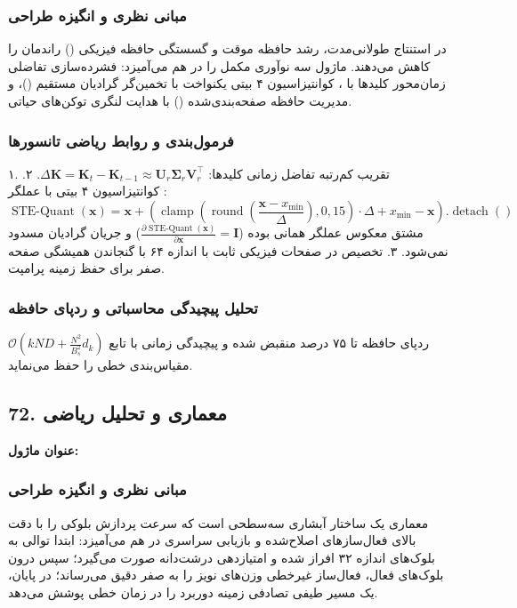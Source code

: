 \subsubsection*{مبانی نظری و انگیزه طراحی}
در استنتاج طولانی‌مدت، رشد حافظه موقت و گسستگی حافظه فیزیکی () راندمان را کاهش می‌دهند. ماژول  سه نوآوری مکمل را در هم می‌آمیزد: فشرده‌سازی تفاضلی زمان‌محور کلیدها با ، کوانتیزاسیون ۴ بیتی یکنواخت با تخمین‌گر گرادیان مستقیم ()، و مدیریت حافظه صفحه‌بندی‌شده () با هدایت لنگری توکن‌های حیاتی.

\subsubsection*{فرمول‌بندی و روابط ریاضی تانسورها}
۱. تقریب کم‌رتبه تفاضل زمانی کلیدها: $\Delta \mathbf{K} = \mathbf{K}_t - \mathbf{K}_{t-1} \approx \mathbf{U}_r \mathbf{\Sigma}_r \mathbf{V}_r^\top$.
۲. کوانتیزاسیون ۴ بیتی با عملگر :
\begin{equation}
\operatorname{STE-Quant}(\mathbf{x}) = \mathbf{x} + \left(\operatorname{clamp}\left(\operatorname{round}\left(\frac{\mathbf{x} - x_{\min}}{\Delta}\right), 0, 15\right) \cdot \Delta + x_{\min} - \mathbf{x}\right).\operatorname{detach}()
\end{equation}
مشتق معکوس عملگر همانی بوده ($\frac{\partial \operatorname{STE-Quant}(\mathbf{x})}{\partial \mathbf{x}} = \mathbf{I}$) و جریان گرادیان مسدود نمی‌شود.
۳. تخصیص در صفحات فیزیکی ثابت با اندازه ۶۴ با گنجاندن همیشگی صفحه صفر برای حفظ زمینه پرامپت.

\subsubsection*{تحلیل پیچیدگی محاسباتی و ردپای حافظه}
ردپای حافظه  تا ۷۵ درصد منقبض شده و پیچیدگی زمانی با تابع $\mathcal{O}\left(k N D + \frac{N^2}{B_s^2} d_k\right)$ مقیاس‌بندی خطی را حفظ می‌نماید.


\subsection*{72. معماری و تحلیل ریاضی }
\textbf{عنوان ماژول:} 

\subsubsection*{مبانی نظری و انگیزه طراحی}
معماری  یک ساختار آبشاری سه‌سطحی است که سرعت پردازش بلوکی را با دقت بالای فعال‌سازهای اصلاح‌شده و بازیابی سراسری در هم می‌آمیزد: ابتدا توالی به بلوک‌های اندازه ۳۲ افراز شده و امتیازدهی درشت‌دانه صورت می‌گیرد؛ سپس درون بلوک‌های فعال، فعال‌ساز غیرخطی  وزن‌های نویز را به صفر دقیق می‌رساند؛ در پایان، یک مسیر طیفی تصادفی زمینه دوربرد را در زمان خطی پوشش می‌دهد.

